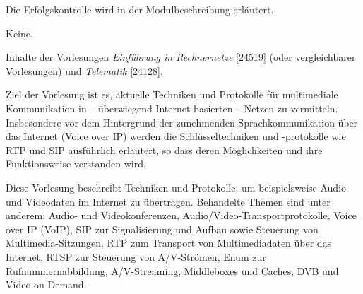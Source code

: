 \begin{course}

\setdoclanguagegerman
{}



\coursehead


\label{cour_5363.dp_997}


\begin{styleenv}
\begin{assessment}
Die Erfolgskontrolle wird in der Modulbeschreibung erläutert.


\end{assessment}

\begin{conditions}Keine.\end{conditions}

\begin{recommendations}Inhalte der Vorlesungen \emph{Einführung in Rechnernetze} [24519] (oder vergleichbarer Vorlesungen) und \emph{Telematik }[24128].

\end{recommendations}
\end{styleenv}

\begin{learningoutcomes}
Ziel der Vorlesung ist es, aktuelle Techniken und Protokolle für multimediale Kommunikation in – überwiegend Internet-basierten – Netzen zu vermitteln. Insbesondere vor dem Hintergrund der zunehmenden Sprachkommunikation über das Internet (Voice over IP) werden die Schlüsseltechniken und -protokolle wie RTP und SIP ausführlich erläutert, so dass deren Möglichkeiten und ihre Funktionsweise verstanden wird.


\end{learningoutcomes}

\begin{content}
Diese Vorlesung beschreibt Techniken und Protokolle, um beispielsweise Audio- und Videodaten im Internet zu übertragen. Behandelte Themen sind unter anderem: Audio- und Videokonferenzen, Audio/Video-Transportprotokolle, Voice over IP (VoIP), SIP zur Signalisierung und Aufbau sowie Steuerung von Multimedia-Sitzungen, RTP zum Transport von Multimediadaten über das Internet, RTSP zur Steuerung von A/V-Strömen, Enum zur Rufnummernabbildung, A/V-Streaming, Middleboxes und Caches, DVB und Video on Demand.



\end{content}
\end{course}
